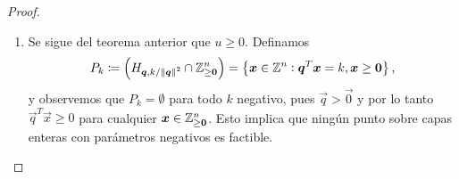 \begin{proof}
\begin{enumerate}
			Por hipótesis, sabemos que $\vec{q}$ tiene una entrada negativa y por lo tanto $I^- \neq
			\emptyset$. Además, por la definición \ref{theory:def:rational}, $\vec{q}$ tiene una
			entrada positiva y por lo tanto $I^+ \neq \emptyset$. Luego, ambos conjuntos $I^+$ e
			$I^-$ forman una partición del conjunto $\braces{1, \ldots, n}$. Podemos escoger
			enteros positivos $\braces{c_i}_{i \in I^+}$ que satisfagan simultáneamente
			\begin{align}
				x_k + \sum_{i \in I^+}q_ic_i &\geq 0, \quad \forall k \in I^-,
				\label{theory:pf:1} \\
				x_k - \sum_{j \in I^-}q_jc_k &\geq 0, \quad \forall k \in I^+.
				\label{theory:pf:2}
			\end{align}
			Definamos el vector $\vec{x}^+ \in \Z^n$ de manera que
			\begin{equation*}
				x^+_k \coloneq \begin{cases}
					x_k + \sum_{i \in I^+}q_ic_i, \quad k \in I^-, \\
					x_k - \sum_{j \in I^-}q_jc_k, \quad k \in I^+.
				\end{cases}
			\end{equation*}
			Se verifica que $\vec{x}^+$ es no negativo y, además,
			\begin{align*}
				\vec{q}^T\vec{x}^+
				&= \vec{q}^T\vec{x}
				+ \sum_{k \in I^-}\sum_{i \in I^+}q_kq_ic_i
				- \sum_{k \in I^+}\sum_{j \in I^-}q_kq_jc_k \\
				&= \eta
				+ \sum_{j \in I^-}\sum_{i \in I^+}q_jq_ic_i
				- \sum_{i \in I^+}\sum_{j \in I^-}q_iq_jc_i \\
				&= \eta.
			\end{align*}
			Así pues, tenemos existencia de un punto factible. Para concluir que hay un número
			infinito de puntos factibles, basta observar que si la elección de coeficientes
			$\braces{c_i}_{i \in I^+}$ satisface ambas desigualdades \eqref{theory:pf:1} y \eqref{theory:pf:2},
			entonces cualquier múltiplo entero positivo de estos coeficientes también las satisface.
		\item Se sigue del teorema anterior que $u \geq 0$. Definamos
			\begin{equation}
				\label{theory:pf:p_k}
				P_k \coloneq \left( H_{\boldsymbol{q}, k/\left\lVert \boldsymbol{q} \right\rVert^{2}} \cap \mathbb{Z}_{\geq \boldsymbol{0}}^n \right)
				= \left\lbrace \boldsymbol{x} \in \mathbb{Z}^n \vcentcolon \boldsymbol{q}^T\boldsymbol{x} = k,
					\boldsymbol{x} \geq \boldsymbol{0} \right\rbrace,
			\end{equation}
			y observemos que $P_k = \emptyset$ para todo $k$ negativo, pues $\vec{q} > \vec{0}$ y por
			lo tanto $\vec{q}^T\vec{x} \geq 0$ para cualquier $\boldsymbol{x} \in \mathbb{Z}^n_{\geq \boldsymbol{0}}$. Esto implica que
			ningún punto sobre capas enteras con parámetros negativos es factible.


\end{enumerate}
\end{proof}
